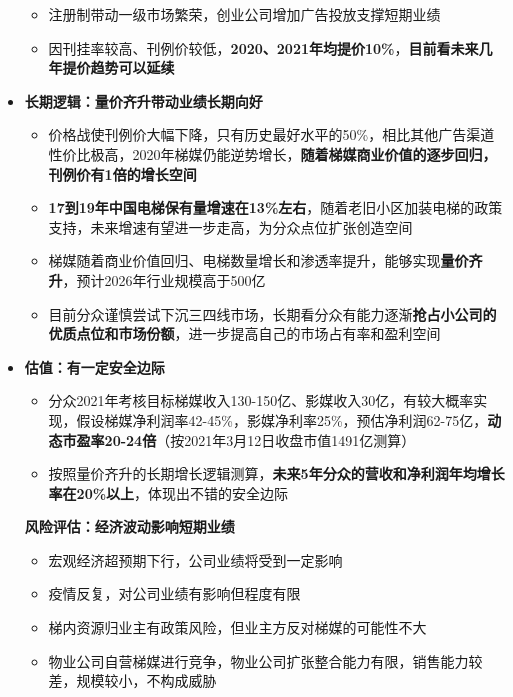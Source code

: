 \begin{itemize}[leftmargin=*]
{\begin{itemize}
        \item 注册制带动一级市场繁荣，创业公司增加广告投放支撑短期业绩
        \item 因刊挂率较高、刊例价较低，\textbf{2020、2021年均提价10\%}，\textbf{目前看未来几年提价趋势可以延续}
      \end{itemize}
      }
    \item
      \textbf{长期逻辑：量价齐升带动业绩长期向好}
      {\small
      \begin{itemize}
        \item 价格战使刊例价大幅下降，只有历史最好水平的50\%，相比其他广告渠道性价比极高，2020年梯媒仍能逆势增长，\textbf{随着梯媒商业价值的逐步回归，刊例价有1倍的增长空间}
        \item \textbf{17到19年中国电梯保有量增速在13\%左右}，随着老旧小区加装电梯的政策支持，未来增速有望进一步走高，为分众点位扩张创造空间
        \item 梯媒随着商业价值回归、电梯数量增长和渗透率提升，能够实现\textbf{量价齐升}，预计2026年行业规模高于500亿
        \item 目前分众谨慎尝试下沉三四线市场，长期看分众有能力逐渐\textbf{抢占小公司的优质点位和市场份额}，进一步提高自己的市场占有率和盈利空间
      \end{itemize}
      }
      \item
      \textbf{估值：有一定安全边际}
      {\small
      \begin{itemize}
        \item 分众2021年考核目标梯媒收入130-150亿、影媒收入30亿，有较大概率实现，假设梯媒净利润率42-45\%，影媒净利率25\%，预估净利润62-75亿，\textbf{动态市盈率20-24倍}（按2021年3月12日收盘市值1491亿测算）
        \item 按照量价齐升的长期增长逻辑测算，\textbf{未来5年分众的营收和净利润年均增长率在20\%以上}，体现出不错的安全边际
      \end{itemize}
      }
      \textbf{风险评估：经济波动影响短期业绩}
      {\small
      \begin{itemize}
        \item 宏观经济超预期下行，公司业绩将受到一定影响
        \item 疫情反复，对公司业绩有影响但程度有限
        \item 梯内资源归业主有政策风险，但业主方反对梯媒的可能性不大
        \item 物业公司自营梯媒进行竞争，物业公司扩张整合能力有限，销售能力较差，规模较小，不构成威胁
      \end{itemize}
      }
  \end{itemize}